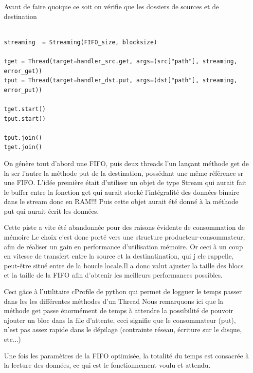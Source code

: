 Avant de faire quoique ce soit on vérifie que les dossiers de sources et de destination

\begin{verbatim}

streaming  = Streaming(FIFO_size, blocksize)

tget = Thread(target=handler_src.get, args=(src["path"], streaming, error_get))
tput = Thread(target=handler_dst.put, args=(dst["path"], streaming, error_put))

tget.start()
tput.start()

tput.join()
tget.join()

\end{verbatim}

On génère tout d'abord une FIFO, puis deux threads l'un lançant méthode get de la scr l'autre la méthode put de la destination, possédant une même référence sr une FIFO.
L'idée première était d'utiliser un objet de type Stream qui aurait fait le buffer entre la fonction get qui aurait stocké l'intégralité des données binaire dans le stream donc en RAM!!! Puis cette objet aurait été donné à la méthode put qui aurait écrit les données. 

Cette piste a vite été abandonnée pour des raisons évidente de consommation de mémoire 
Le choix c'est donc porté vers une structure producteur-consommateur, afin de réaliser un gain en performance d'utilisation mémoire. Or ceci à un coup en vitesse de transfert entre la source et la destinatination, qui j ele rappelle, peut-être situé entre de la boucle locale.Il a donc valut ajuster la taille des blocs et la taille de la FIFO afin d'obtenir les meilleurs performances possibles.

Ceci gâce à l'utilitaire cProfile de python qui permet de logguer le temps passer dans les les différentes méthodes d'un Thread
Nous remarquons ici que la méthode get passe énormément de temps à attendre la possibilité de pouvoir ajouter un bloc dans la file d'attente, ceci signifie que le consommateur (put), n'est pas assez rapide dans le dépilage (contrainte réseau, écriture sur le disque, etc...)

Une fois les paramètres de la FIFO optimisée, la totalité du temps est consacrée à la lecture des données, ce qui est le fonctionnement voulu et attendu.
